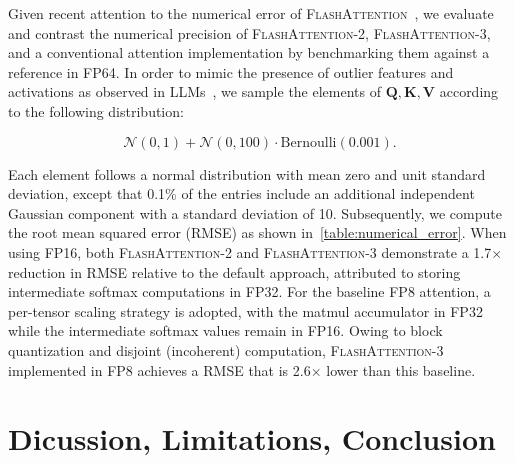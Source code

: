 \begin{itemize}
Given recent attention to the numerical error of \textsc{FlashAttention}~\citep{golden2024flash}, we evaluate and contrast the numerical precision of \textsc{FlashAttention-2}, \textsc{FlashAttention-3}, and a conventional attention implementation by benchmarking them against a reference in FP64. In order to mimic the presence of outlier features and activations as observed in LLMs~\citep{dettmers2208llm, sun2024massive}, we sample the elements of $\mathbf{Q}, \mathbf{K}, \mathbf{V}$ according to the following distribution:

\begin{equation*}
  \mathcal{N}(0, 1) + \mathcal{N}(0, 100) \cdot \mathrm{Bernoulli}(0.001).
\end{equation*}

Each element follows a normal distribution with mean zero and unit standard deviation, except that 0.1\% of the entries include an additional independent Gaussian component with a standard deviation of 10. Subsequently, we compute the root mean squared error (RMSE) as shown in~\cref{table:numerical_error}. When using FP16, both \textsc{FlashAttention-2} and \textsc{FlashAttention-3} demonstrate a 1.7$\times$ reduction in RMSE relative to the default approach, attributed to storing intermediate softmax computations in FP32. For the baseline FP8 attention, a per-tensor scaling strategy is adopted, with the matmul accumulator in FP32 while the intermediate softmax values remain in FP16. Owing to block quantization and disjoint (incoherent) computation, \textsc{FlashAttention-3} implemented in FP8 achieves a RMSE that is 2.6$\times$ lower than this baseline.

\section{Dicussion, Limitations, Conclusion}
\label{sec:discussion}


\end{itemize}
